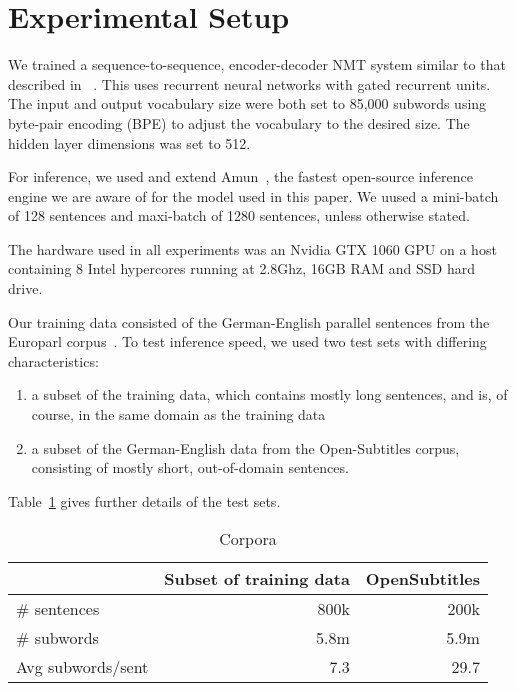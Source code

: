 \documentclass[11pt,a4paper]{article}
\begin{document}
\section{Experimental Setup}
\label{sec:Experimental Setup}

We trained a sequence-to-sequence, encoder-decoder NMT system similar to that described in ~\cite{sennrich-haddow-birch:2016:P16-12}. This uses recurrent neural networks with gated recurrent units. The input and output vocabulary size were both set to 85,000 subwords using byte-pair encoding (BPE) to adjust the vocabulary to the desired size. The hidden layer dimensions was set to 512. %

For inference, we used and extend Amun~\citep{junczys2016neural}, the fastest open-source inference engine we are aware of for the model used in this paper. We uused a mini-batch of 128 sentences and maxi-batch of 1280 sentences, unless otherwise stated.

The hardware used in all experiments was an Nvidia GTX 1060 GPU on a host containing 8 Intel hypercores running at 2.8Ghz, 16GB RAM and SSD hard drive.

Our training data consisted of the German-English parallel sentences from the Europarl corpus~\citep{Koehn:2005:MTS}. To test inference speed, we used two test sets with differing characteristics:
\begin{enumerate}
   \item \vspace{-2 mm} a subset of the training data, which contains mostly long sentences, and is, of course, in the same domain as the training data
   \item \vspace{-2 mm} a subset of the German-English data from the Open-Subtitles corpus, consisting of mostly short, out-of-domain sentences.
\end{enumerate}
Table~\ref{tab:corpora} gives further details of the test sets.

\begin{table}
\begin{center}
\small
\begin{tabular}{|l|r|r|} \hline
		& Subset of training data		& OpenSubtitles \\ \hline
\# sentences  	& 800k 		& 200k \\
\# subwords 	& 5.8m 		& 5.9m \\ 
Avg subwords/sent	& 7.3		& 29.7 \\ \hline
\end{tabular}
\end{center}
\caption{Corpora}
\label{tab:corpora}
\end{table}
\end{document}
